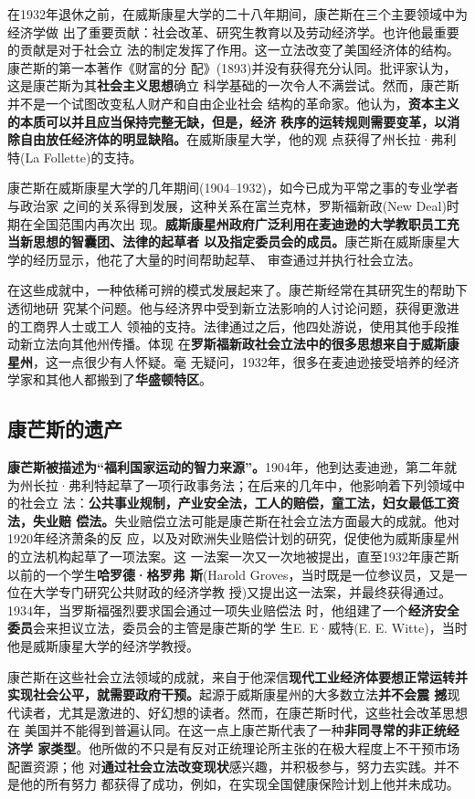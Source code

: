 在1932年退休之前，在威斯康星大学的二十八年期间，康芒斯在三个主要领域中为经济学做
出了重要贡献：社会改革、研究生教育以及劳动经济学。也许他最重要的贡献是对于社会立
法的制定发挥了作用。这一立法改变了美国经济体的结构。康芒斯的第一本著作《财富的分
配》(1893)并没有获得充分认同。批评家认为，这是康芒斯为其\textbf{社会主义思想}确立
科学基础的一次令人不满尝试。然而，康芒斯并不是一个试图改变私人财产和自由企业社会
结构的革命家。他认为，\textbf{资本主义的本质可以并且应当保持完整无缺，但是，经济
  秩序的运转规则需要变革，以消除自由放任经济体的明显缺陷。}在威斯康星大学，他的观
点获得了州长拉·弗利特(La Follette)的支持。

康芒斯在威斯康星大学的几年期间(1904--1932)，如今已成为平常之事的专业学者与政治家
之间的关系得到发展，这种关系在富兰克林，罗斯福新政(New Deal)时期在全国范围内再次出
现。\textbf{威斯康星州政府广泛利用在麦迪逊的大学教职员工充当新思想的智囊团、法律的起草者
以及指定委员会的成员。}康芒斯在威斯康星大学的经历显示，他花了大量的时间帮助起草、
审查通过并执行社会立法。

在这些成就中，一种依稀可辨的模式发展起来了。康芒斯经常在其研究生的帮助下透彻地研
究某个问题。他与经济界中受到新立法影响的人讨论问题，获得更激进的工商界人士或工人
领袖的支持。法律通过之后，他四处游说，使用其他手段推动新立法向其他州传播。体现
在\textbf{罗斯福新政社会立法中的很多思想来自于威斯康星州}，这一点很少有人怀疑。毫
无疑问，1932年，很多在麦迪逊接受培养的经济学家和其他人都搬到了\textbf{华盛顿特区}。

\subsection{康芒斯的遗产}

\textbf{康芒斯被描述为“福利国家运动的智力来源”。}1904年，他到达麦迪逊，第二年就
为州长拉·弗利特起草了一项行政事务法；在后来的几年中，他影响着下列领域中的社会立
法：\textbf{公共事业规制，产业安全法，工人的赔偿，童工法，妇女最低工资法，失业赔
  偿法。}失业赔偿立法可能是康芒斯在社会立法方面最大的成就。他对1920年经济萧条的反
应，以及对欧洲失业赔偿计划的研究，促使他为威斯康星州的立法机构起草了一项法案。这
一法案一次又一次地被提出，直至1932年康芒斯以前的一个学生\textbf{哈罗德·格罗弗
  斯}(Harold Groves，当时既是一位参议员，又是一位在大学专门研究公共财政的经济学教
授)又提出这一法案，并最终获得通过。1934年，当罗斯福强烈要求国会通过一项失业赔偿法
时，他组建了一个\textbf{经济安全委员}会来担议立法，委员会的主管是康芒斯的学
生E. E·威特(E. E. Witte)，当时他是威斯康星大学的经济学教授。

康芒斯在这些社会立法领域的成就，来自于他深信\textbf{现代工业经济体要想正常运转并
  实现社会公平，就需要政府干预。}起源于威斯康星州的大多数立法\textbf{并不会震
  撼}现代读者，尤其是激进的、好幻想的读者。然而，在康芒斯时代，这些社会改革思想在
美国并不能得到普遍认同。在这一点上康芒斯代表了一种\textbf{非同寻常的非正统经济学
  家类型}。他所做的不只是有反对正统理论所主张的在极大程度上不干预市场配置资源；他
对\textbf{通过社会立法改变现状}感兴趣，并积极参与，努力去实践。并不是他的所有努力
都获得了成功，例如，在实现全国健康保险计划上他并未成功。

